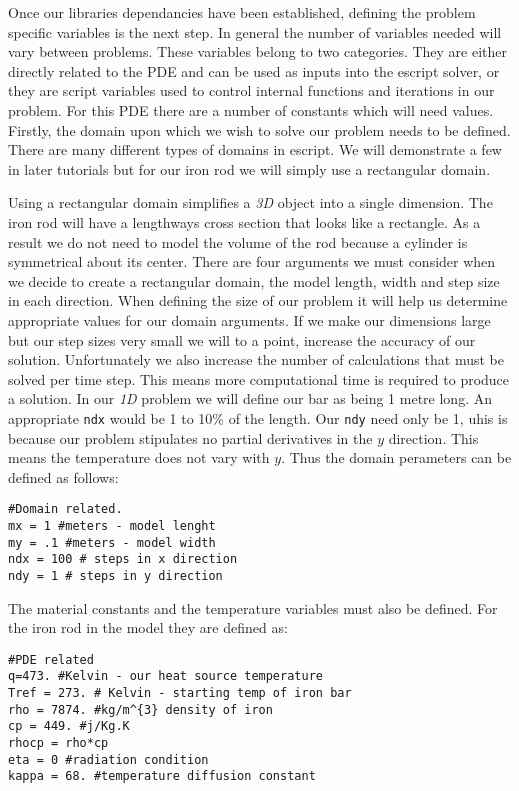Once our libraries dependancies have been established, defining the problem specific variables is the next step. In general the number of variables needed will vary between problems. These variables belong to two categories. They are either directly related to the PDE and can be used as inputs into the escript solver, or they are script variables used to control internal functions and iterations in our problem. For this PDE there are a number of constants which will need values. Firstly, the domain upon which we wish to solve our problem needs to be defined. There are many different types of domains in escript. We will demonstrate a few in later tutorials but for our iron rod we will simply use a rectangular domain. 

Using a rectangular domain simplifies a \textit{3D} object into a single dimension. The iron rod will have a lengthways cross section that looks like a rectangle.  As a result we do not need to model the volume of the rod because a cylinder is symmetrical about its center. There are four arguments we must consider when we decide to create a rectangular domain, the model length, width and step size in each direction. When defining the size of our problem it will help us determine appropriate values for our domain arguments. If we make our dimensions large but our step sizes very small we will to a point, increase the accuracy of our solution. Unfortunately we also increase the number of calculations that must be solved per time step. This means more computational time is required to produce a solution. In our \textit{1D} problem we will define our bar as being 1 metre long. An appropriate \verb|ndx| would be 1 to 10\% of the length. Our \verb|ndy| need only be 1, uhis is because our problem stipulates no partial derivatives in the $y$ direction. This means the temperature does not vary with $y$. Thus the domain perameters can be defined as follows:
\begin{verbatim}
#Domain related.
mx = 1 #meters - model lenght
my = .1 #meters - model width
ndx = 100 # steps in x direction 
ndy = 1 # steps in y direction
\end{verbatim}
The material constants and the temperature variables must also be defined. For the iron rod in the model they are defined as:
\begin{verbatim}
#PDE related
q=473. #Kelvin - our heat source temperature
Tref = 273. # Kelvin - starting temp of iron bar
rho = 7874. #kg/m^{3} density of iron
cp = 449. #j/Kg.K
rhocp = rho*cp
eta = 0 #radiation condition
kappa = 68. #temperature diffusion constant
\end{verbatim}
